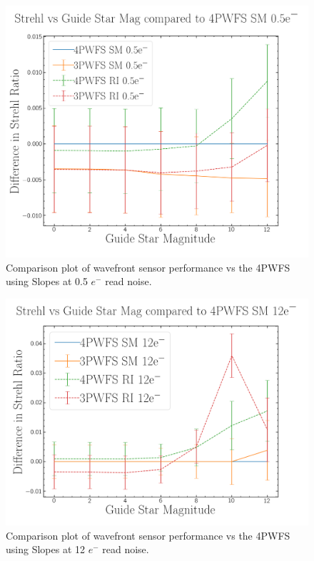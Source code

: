 \begin{figure}[h]
    \centering
    \includegraphics[width=.7\linewidth]{Chapter Materials/Chapter Four Materials/StrehlvGuideStarvs4PWFSRM0e.png}
    \caption{Comparison plot of wavefront sensor performance vs the 4PWFS using Slopes at 0.5 $e^-$ read noise. }
    \label{fig:0RN}
\end{figure}

\begin{figure}[h]
    \centering
    \includegraphics[width=.7\linewidth]{Chapter Materials/Chapter Four Materials/StrehlvGuideStarvs4PWFSRM12e.png}
    \caption{Comparison plot of wavefront sensor performance vs the 4PWFS using Slopes at 12 $e^-$ read noise.}
    \label{fig:12RN}
\end{figure}

\newpage